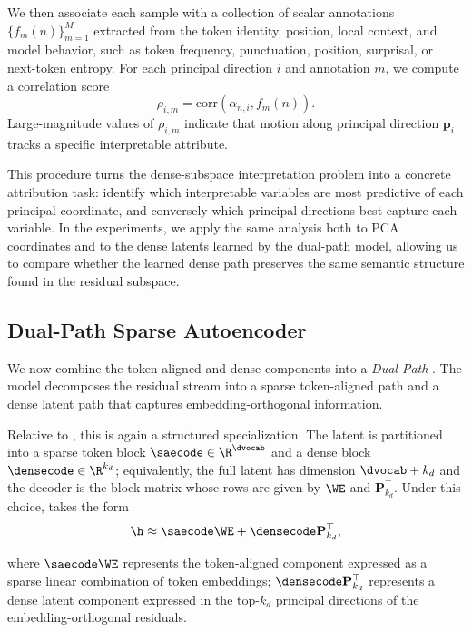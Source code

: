 \documentclass{article}
\begin{document}
We then associate each sample with a collection of scalar annotations $\{f_m(n)\}_{m=1}^{M}$ extracted from the token identity, position, local context, and model behavior, such as token frequency, punctuation, position, surprisal, or next-token entropy. For each principal direction $i$ and annotation $m$, we compute a correlation score
\begin{equation}
  \label{eq:dense-subspace-correlation}
  \rho_{i,m} = \mathrm{corr}(\alpha_{n,i}, f_m(n)) .
\end{equation}
Large-magnitude values of $\rho_{i,m}$ indicate that motion along principal direction $\mathbf{p}_i$ tracks a specific interpretable attribute.

This procedure turns the dense-subspace interpretation problem into a concrete attribution task: identify which interpretable variables are most predictive of each principal coordinate, and conversely which principal directions best capture each variable. In the experiments, we apply the same analysis both to PCA coordinates and to the dense latents learned by the dual-path model, allowing us to compare whether the learned dense path preserves the same semantic structure found in the residual subspace.

\subsection{Dual-Path Sparse Autoencoder}
\label{subsec:method_dualpath}

We now combine the token-aligned and dense components into a \textit{Dual-Path }. The model decomposes the residual stream into a sparse token-aligned path and a dense latent path that captures embedding-orthogonal information.

Relative to , this is again a structured specialization. The latent is partitioned into a sparse token block $\saecode \in \R^{\dvocab}$ and a dense block $\densecode \in \R^{k_d}$; equivalently, the full latent has dimension $\dvocab + k_d$ and the decoder is the block matrix whose rows are given by $\WE$ and $\mathbf{P}_{k_d}^\top$. Under this choice,  takes the form
\begin{equation}
  \h \approx \saecode \WE + \densecode \mathbf{P}_{k_d}^\top ,
\end{equation}

where $\saecode \WE$ represents the token-aligned component expressed as a sparse linear combination of token embeddings; $\densecode \mathbf{P}_{k_d}^\top$ represents a dense latent component expressed in the top-$k_d$ principal directions of the embedding-orthogonal residuals.
\end{document}
